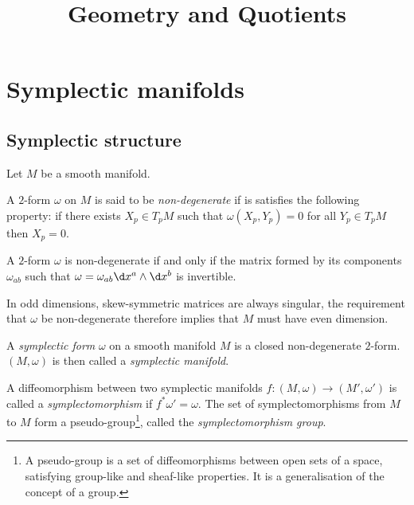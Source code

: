 \documentclass{worksheetclass}
\title{Geometry and Quotients}
\begin{document}
\maketitle

\tableofcontents

\pagebreak

\section{Symplectic manifolds}

    \subsection{Symplectic structure}

        Let $M$ be a smooth manifold.    
        \begin{defn}
            A $2$-form $\omega$ on $M$ is said to be \emph{non-degenerate} if is satisfies the following property: if there exists $X_p\in T_pM$ such that $\omega(X_p,Y_p)=0$ for all $Y_p\in T_pM$ then $X_p=0$.
        \end{defn}
        
        \begin{prop}
            A $2$-form $\omega$ is non-degenerate if and only if the matrix formed by its components $\omega_{ab}$ such that $\omega=\omega_{ab}\d x^a\wedge\d x^b$ is invertible.
        \end{prop}
        
        In odd dimensions, skew-symmetric matrices are always singular, the requirement that $\omega$ be non-degenerate therefore implies that $M$ must have even dimension.
    
        \begin{defn}
            A \emph{symplectic form} $\omega$ on a smooth manifold $M$ is a closed non-degenerate $2$-form. $(M,\omega)$ is then called a \emph{symplectic manifold}.
        \end{defn}
        \begin{defn}
            A diffeomorphism between two symplectic manifolds $f:(M,\omega)\to(M',\omega')$ is called a \emph{symplectomorphism} if $f^*\omega' = \omega$. The set of symplectomorphisms from $M$ to $M$ form a pseudo-group\footnote{A pseudo-group is a set of diffeomorphisms between open sets of a space, satisfying group-like and sheaf-like properties. It is a generalisation of the concept of a group.}, called the \emph{symplectomorphism group}.
        \end{defn}
\end{document}
